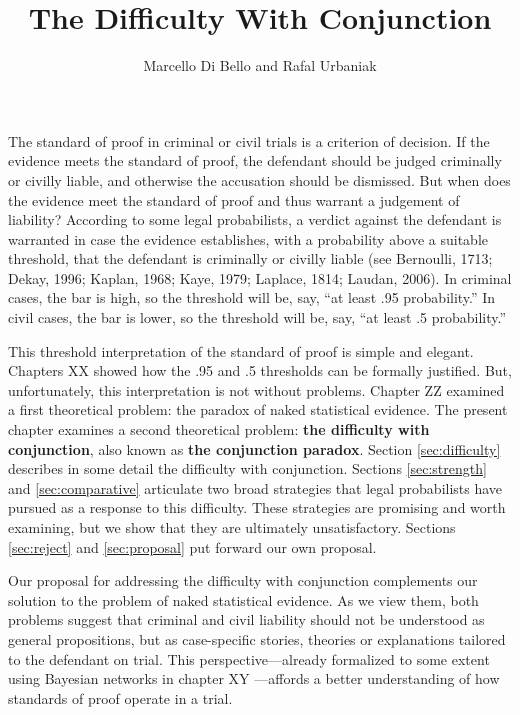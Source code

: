 \documentclass[
  10pt,
  dvipsnames,enabledeprecatedfontcommands]{scrartcl}
\title{The Difficulty With Conjunction}
\author{Marcello Di Bello and Rafal Urbaniak}
\date{}
\begin{document}
\maketitle

The standard of proof in criminal or civil trials is a criterion of
decision. If the evidence meets the standard of proof, the defendant
should be judged criminally or civilly liable, and otherwise the
accusation should be dismissed. But when does the evidence meet the
standard of proof and thus warrant a judgement of liability? According
to some legal probabilists, a verdict against the defendant is warranted
in case the evidence establishes, with a probability above a suitable
threshold, that the defendant is criminally or civilly liable (see
Bernoulli, 1713; Dekay, 1996; Kaplan, 1968; Kaye, 1979; Laplace, 1814;
Laudan, 2006). In criminal cases, the bar is high, so the threshold will
be, say, ``at least .95 probability.'' In civil cases, the bar is lower,
so the threshold will be, say, ``at least .5 probability.''

This threshold interpretation of the standard of proof is simple and
elegant. Chapters XX  showed how the .95
and .5 thresholds can be formally justified. But, unfortunately, this
interpretation is not without problems. Chapter ZZ
 examined a first theoretical problem:
the paradox of naked statistical evidence. The present chapter examines
a second theoretical problem: \textbf{the difficulty with conjunction},
also known as \textbf{the conjunction paradox}. Section
\ref{sec:difficulty} describes in some detail the difficulty with
conjunction. Sections \ref{sec:strength} and \ref{sec:comparative}
articulate two broad strategies that legal probabilists have pursued as
a response to this difficulty. These strategies are promising and worth
examining, but we show that they are ultimately unsatisfactory. Sections
\ref{sec:reject} and \ref{sec:proposal} put forward our own proposal.

Our proposal for addressing the difficulty with conjunction complements
our solution to the problem of naked statistical evidence. As we view
them, both problems suggest that criminal and civil liability should not
be understood as general propositions, but as case-specific stories,
theories or explanations tailored to the defendant on trial. This
perspective---already formalized to some extent using Bayesian networks
in chapter XY ---affords a better
understanding of how standards of proof operate in a trial.
\end{document}
